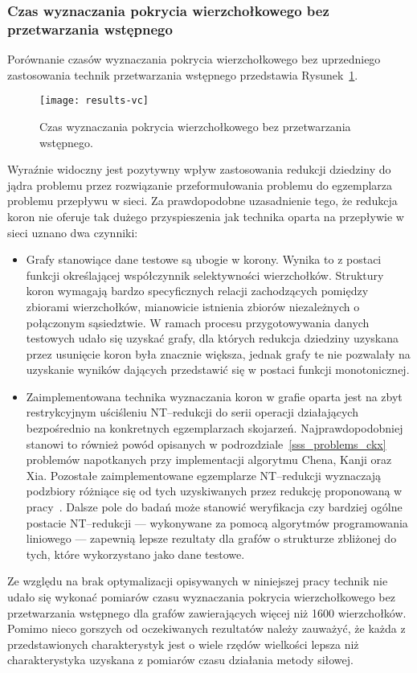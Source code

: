 \subsubsection{\textbf{Czas wyznaczania pokrycia wierzchołkowego bez przetwarzania wstępnego}}\label{time_vc}
\par{
  Porównanie czasów wyznaczania pokrycia wierzchołkowego bez uprzedniego zastosowania technik przetwarzania wstępnego przedstawia Rysunek~\ref{fig_results_vc}.
  \begin{figure}
    \caption{Czas wyznaczania pokrycia wierzchołkowego bez przetwarzania wstępnego.}
    \label{fig_results_vc}
    \centering
      \texttt{[image: results-vc]}
  \end{figure}
  Wyraźnie widoczny jest pozytywny wpływ zastosowania redukcji dziedziny do jądra problemu przez rozwiązanie przeformułowania problemu do egzemplarza problemu przepływu w sieci.
  Za prawdopodobne uzasadnienie tego, że redukcja koron nie oferuje tak dużego przyspieszenia jak technika oparta na przepływie w sieci uznano dwa czynniki:
  \begin{itemize}
    \item Grafy stanowiące dane testowe są ubogie w korony.
    Wynika to z postaci funkcji określającej współczynnik selektywności wierzchołków. Struktury koron wymagają bardzo specyficznych relacji zachodzących pomiędzy zbiorami wierzchołków, mianowicie istnienia zbiorów niezależnych o połączonym sąsiedztwie.
    W ramach procesu przygotowywania danych testowych udało się uzyskać grafy, dla których redukcja dziedziny uzyskana przez usunięcie koron była znacznie większa, jednak grafy te nie pozwalały na uzyskanie wyników dających przedstawić się w postaci funkcji monotonicznej.
    \item Zaimplementowana technika wyznaczania koron w grafie oparta jest na zbyt restrykcyjnym uściśleniu NT--redukcji do serii operacji działających bezpośrednio na konkretnych egzemplarzach skojarzeń.
    Najprawdopodobniej stanowi to również powód opisanych w podrozdziale~\ref{sss_problems_ckx} problemów napotkanych przy implementacji algorytmu Chena, Kanji oraz Xia.
    Pozostałe zaimplementowane egzemplarze NT--redukcji wyznaczają podzbiory różniące się od tych uzyskiwanych przez redukcję proponowaną w pracy~\cite{KernelizationAlgorithms04}.
    Dalsze pole do badań może stanowić weryfikacja czy bardziej ogólne postacie NT--redukcji --- wykonywane za pomocą algorytmów programowania liniowego --- zapewnią lepsze rezultaty dla grafów o strukturze zbliżonej do tych, które wykorzystano jako dane testowe.
  \end{itemize}

  Ze względu na brak optymalizacji opisywanych w niniejszej pracy technik nie udało się wykonać pomiarów czasu wyznaczania pokrycia wierzchołkowego bez przetwarzania wstępnego dla grafów zawierających więcej niż 1600 wierzchołków.
  Pomimo nieco gorszych od oczekiwanych rezultatów należy zauważyć, że każda z przedstawionych charakterystyk jest o wiele rzędów wielkości lepsza niż charakterystyka uzyskana z pomiarów czasu działania metody siłowej.
}
